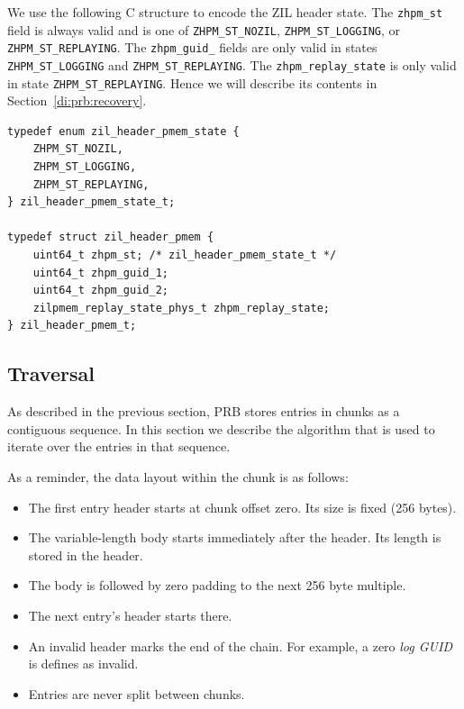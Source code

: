 \documentclass[12pt,a4paper,twoside]{book}
\begin{document}
We use the following C structure to encode the ZIL header state.
The \lstinline{zhpm_st} field is always valid and is one of \lstinline{ZHPM_ST_NOZIL}, \lstinline{ZHPM_ST_LOGGING}, or \lstinline{ZHPM_ST_REPLAYING}.
The \lstinline{zhpm_guid_} fields are only valid in states \lstinline{ZHPM_ST_LOGGING} and \lstinline{ZHPM_ST_REPLAYING}.
The \lstinline{zhpm_replay_state} is only valid in state \lstinline{ZHPM_ST_REPLAYING}.
Hence we will describe its contents in Section~\ref{di:prb:recovery}.
\begin{lstlisting}
typedef enum zil_header_pmem_state {
    ZHPM_ST_NOZIL,
    ZHPM_ST_LOGGING,
    ZHPM_ST_REPLAYING,
} zil_header_pmem_state_t;

typedef struct zil_header_pmem {
    uint64_t zhpm_st; /* zil_header_pmem_state_t */
    uint64_t zhpm_guid_1;
    uint64_t zhpm_guid_2;
    zilpmem_replay_state_phys_t zhpm_replay_state;
} zil_header_pmem_t;
\end{lstlisting}


\subsection{Traversal}\label{di:prb:traversal}
As described in the previous section, PRB stores entries in chunks as a contiguous sequence.
In this section we describe the algorithm that is used to iterate over the entries in that sequence.

As a reminder, the data layout within the chunk is as follows:
\begin{itemize}[noitemsep]
    \item The first entry header starts at chunk offset zero. Its size is fixed (256 bytes).
    \item The variable-length body starts immediately after the header. Its length is stored in the header.
    \item The body is followed by zero padding to the next 256 byte multiple.
    \item The next entry's header starts there.
    \item An invalid header marks the end of the chain. For example, a zero \textit{log GUID} is defines as invalid.
    \item Entries are never split between chunks.
\end{itemize}
\end{document}

